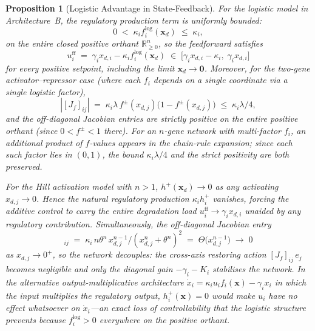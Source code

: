 \documentclass[12pt]{article}
\newtheorem{proposition}{Proposition}
\begin{document}
\begin{proposition}[Logistic Advantage in State-Feedback]
\label{prop:sf_advantage}
For the logistic model in Architecture~B, the regulatory production term
is uniformly bounded:
\begin{equation}
0 \;<\; \kappa_i f_i^{\mathrm{log}}(\mathbf{x}_d) \;\leq\; \kappa_i,
\end{equation}
on the entire closed positive orthant $\mathbb{R}_{\geq 0}^n$, so the
feedforward satisfies
\begin{equation}
u_i^{\mathrm{ff}} \;=\; \gamma_i x_{d,i} - \kappa_i f_i^{\mathrm{log}}(\mathbf{x}_d)
\;\in\; \bigl[\gamma_i x_{d,i}-\kappa_i,\;\gamma_i x_{d,i}\bigr]
\end{equation}
for every positive setpoint, including the limit $\mathbf{x}_d \to \mathbf{0}$.
Moreover, for the two-gene activator--repressor case (where each $f_i$
depends on a single coordinate via a single logistic factor),
\begin{equation}
|[J_f]_{ij}| \;=\; \kappa_i \lambda\, f^\pm(x_{d,j})\bigl(1 - f^\pm(x_{d,j})\bigr)
            \;\leq\; \kappa_i \lambda/4,
\label{eq:Jf_log_bound}
\end{equation}
and the off-diagonal Jacobian entries are \emph{strictly positive} on
the entire positive orthant (since $0<f^\pm<1$ there).
For an $n$-gene network with multi-factor $f_i$, an additional product of
$f$-values appears in the chain-rule expansion; since each such factor lies
in $(0,1)$, the bound $\kappa_i\lambda/4$ and the strict positivity are
both preserved.

For the Hill activation model with $n>1$, $h^+(\mathbf{x}_d) \to 0$
as any activating $x_{d,j}\to 0$. Hence the natural regulatory production
$\kappa_i h^+_i$ vanishes, forcing the additive control to
carry the entire degradation load $u_i^{\mathrm{ff}}\to\gamma_i x_{d,i}$
unaided by any regulatory contribution. Simultaneously, the off-diagonal
Jacobian entry
\begin{equation}
[J_f^{\mathrm{Hill}}]_{ij}
   \;=\; \kappa_i\,n \theta^n\, x_{d,j}^{n-1}
                       /(x_{d,j}^n+\theta^n)^2
   \;=\; \Theta\bigl(x_{d,j}^{n-1}\bigr) \;\to\; 0
\label{eq:Jf_hill_decoupling}
\end{equation}
as $x_{d,j}\to 0^+$, so the network \emph{decouples}: the cross-axis
restoring action $[J_f]_{ij}\,e_j$ becomes negligible and only the
diagonal gain $-\gamma_i-K_i$ stabilises the network. In the alternative
output-multiplicative architecture
$\dot{x}_i=\kappa_i u_i f_i(\mathbf{x})-\gamma_i x_i$ in which the input
multiplies the regulatory output, $h^+_i(\mathbf{x})=0$ would
make $u_i$ have \emph{no effect whatsoever} on $\dot{x}_i$---an exact loss
of controllability that the logistic structure prevents because
$f_i^{\mathrm{log}}>0$ everywhere on the positive orthant.
\end{proposition}
\end{document}
